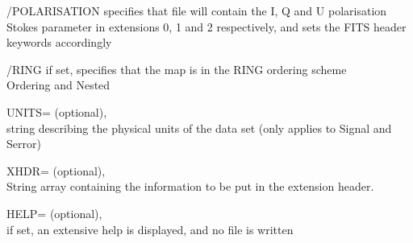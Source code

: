 \begin{keywords}
\begin{kwlist}{}
	\item[{/POLARISATION}] 
	  specifies that file will contain the I, Q and U polarisation
           Stokes parameter in extensions 0, 1 and 2 respectively, and sets the
FITS header keywords accordingly

	\item[{/RING}]   if set, specifies that the map is in the RING ordering
	scheme\\
	\seealso Ordering and Nested

	\item[{UNITS=}] 
		(optional), \\
		string describing the physical units of the data set (only applies
		to Signal and Serror)

    	\item[XHDR=] %
		(optional), \\
		String array containing the information to be put in
		the extension header. 

    	\item[HELP=] %
		(optional), \\
		if set, an extensive help is displayed, and no file is written

   \end{kwlist}
\end{keywords}

\begin{codedescription}

\end{codedescription}



